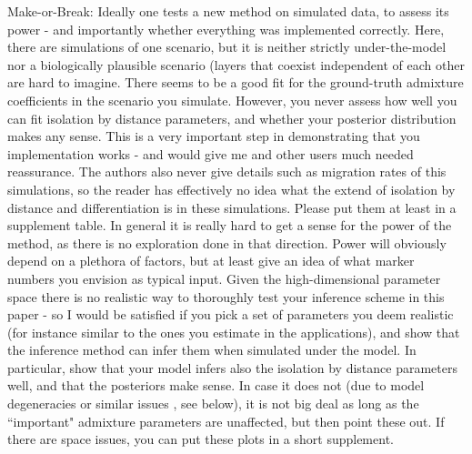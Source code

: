 \begin{point}{}
    Make-or-Break:
Ideally one tests a new method on simulated data, to assess its power -
and importantly whether everything was implemented correctly.
Here, there are simulations of one scenario, but it is neither strictly under-the-model 
nor a biologically plausible scenario (layers that coexist independent of each other are hard to imagine.
There seems to be a good fit for the ground-truth admixture coefficients in the scenario you simulate. 
However, you never assess how well you can fit isolation by distance parameters, 
and whether your posterior distribution makes any sense. 
This is a very important step in demonstrating that you implementation works - 
and would give me and other users much needed reassurance.
The authors also never give details such as migration rates of this simulations, 
so the reader has effectively no idea what the extend of isolation by distance and differentiation is in these simulations. 
Please put them at least in a supplement table. 
In general it is really hard to get a sense for the power of the method, 
as there is no exploration done in that direction. 
Power will obviously depend on a plethora of factors, 
but at least give an idea of what marker numbers you envision as typical input.
Given the high-dimensional parameter space there is no realistic way to thoroughly test your inference scheme in this paper - 
so I would be satisfied if you pick a set of parameters you deem realistic 
(for instance similar to the ones you estimate in the applications), 
and show that the inference method can infer them when simulated under the model. 
In particular, show that your model infers also the isolation by distance parameters well, 
and that the posteriors make sense. 
In case it does not (due to model degeneracies or similar issues , see below), 
it is not big deal as long as the ``important" admixture parameters are unaffected, 
but then point these out.
If there are space issues, you can put these plots in a short supplement.
\end{point}



